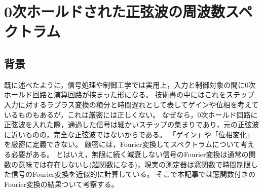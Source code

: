 \chapter{0次ホールドされた正弦波の周波数スペクトラム}
    \label{0次ホールドされた正弦波の周波数スペクトラム}
    \section{背景}
        既に述べたように，信号処理や制御工学では実用上，入力と制御対象の間に0次ホールド回路と演算回路が挟まった形になる。
        技術書の中にはこれをステップ入力に対するラプラス変換の積分と時間遅れとして表してゲインや位相を考えているものもあるが，これは厳密には正しくない。
        なぜなら，0次ホールド回路に正弦波を入れた際，通過した信号は細かいステップの集まりであり，元の正弦波に近いものの，完全な正弦波ではないからである。
        「ゲイン」や「位相変化」を厳密に定義できない。
        厳密には，Fourier変換してスペクトラムについて考える必要がある。
        とはいえ，無限に続く減衰しない信号のFourier変換は通常の関数の意味では存在しないし(超関数になる)，現実の測定器は窓関数で時間制限した信号のFourier変換を近似的に計算している。
        そこで本記事では窓関数付きのFourier変換の結果ついて考察する。
